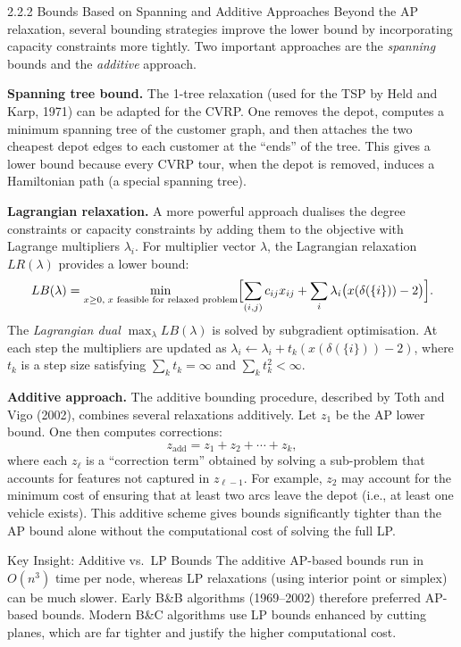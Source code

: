 \documentclass[aspectratio=169,10pt]{beamer}
\begin{document}
\begin{frame}[allowframebreaks]{2.2.2 Bounds Based on Spanning and Additive Approaches}
  Beyond the AP relaxation, several bounding strategies improve the lower
  bound by incorporating capacity constraints more tightly. Two important
  approaches are the \emph{spanning} bounds and the \emph{additive} approach.

  \bigskip
  \textbf{Spanning tree bound.} The 1-tree relaxation (used for the TSP by
  Held and Karp, 1971) can be adapted for the CVRP. One removes the depot,
  computes a minimum spanning tree of the customer graph, and then attaches
  the two cheapest depot edges to each customer at the ``ends'' of the tree.
  This gives a lower bound because every CVRP tour, when the depot is
  removed, induces a Hamiltonian path (a special spanning tree).

  \bigskip
  \textbf{Lagrangian relaxation.} A more powerful approach dualises the
  degree constraints or capacity constraints by adding them to the objective
  with Lagrange multipliers $\lambda_i$. For multiplier vector $\lambda$,
  the Lagrangian relaxation $LR(\lambda)$ provides a lower bound:
  \[
    LB(\lambda) = \min_{x \geq 0,\;x\text{ feasible for relaxed problem}}
                  \Bigl[\sum_{(i,j)} c_{ij} x_{ij}
                        + \sum_i \lambda_i\bigl(x(\delta(\{i\}))-2\bigr)\Bigr].
  \]
  The \emph{Lagrangian dual} $\max_\lambda LB(\lambda)$ is solved by
  subgradient optimisation. At each step the multipliers are updated as
  $\lambda_i \leftarrow \lambda_i + t_k(x(\delta(\{i\}))-2)$, where $t_k$
  is a step size satisfying $\sum_k t_k = \infty$ and $\sum_k t_k^2 < \infty$.

  \framebreak

  \textbf{Additive approach.} The additive bounding procedure, described
  by Toth and Vigo (2002), combines several relaxations additively. Let
  $z_1$ be the AP lower bound. One then computes corrections:
  \[
    z_{\text{add}} = z_1 + z_2 + \cdots + z_k,
  \]
  where each $z_\ell$ is a ``correction term'' obtained by solving a
  sub-problem that accounts for features not captured in $z_{\ell-1}$.
  For example, $z_2$ may account for the minimum cost of ensuring that
  at least two arcs leave the depot (i.e., at least one vehicle exists).
  This additive scheme gives bounds significantly tighter than the AP
  bound alone without the computational cost of solving the full LP.

  \bigskip
  \begin{alertblock}{Key Insight: Additive vs.\ LP Bounds}
    The additive AP-based bounds run in $O(n^3)$ time per node, whereas
    LP relaxations (using interior point or simplex) can be much slower.
    Early B\&B algorithms (1969--2002) therefore preferred AP-based
    bounds. Modern B\&C algorithms use LP bounds enhanced by cutting planes,
    which are far tighter and justify the higher computational cost.
  \end{alertblock}
\end{frame}
\end{document}
